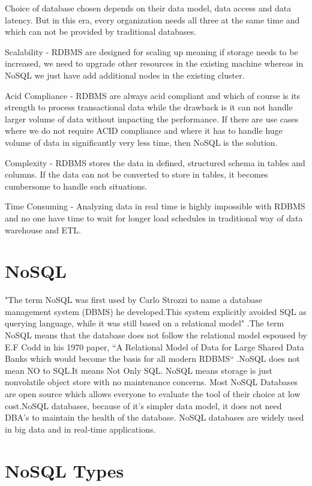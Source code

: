 \documentclass[sigconf]{acmart}
\begin{document}
Choice of database chosen depends on their data model, data access and data latency. But in this era, every organization needs all three at the same time and which can not be provided by traditional databases.

Scalability - RDBMS are designed for scaling up meaning if storage needs to be increased, we need to upgrade other resources in the existing machine whereas in NoSQL we just have add additional nodes in the existing cluster. 

Acid Compliance - RDBMS are always acid compliant and which of course is its strength to process transactional data while the drawback is it can not handle larger volume of data without impacting the performance. If there are use cases where we do not require ACID compliance and  where it has to handle huge volume of data in significantly very less time, then NoSQL is the solution.

Complexity - RDBMS stores the data in defined, structured schema in tables and columns. If the data can not be converted to store in tables, it becomes cumbersome to handle such situations. 

Time Consuming - Analyzing data in real time is highly impossible with RDBMS and no one have time to wait for longer load schedules in traditional way of data warehouse and ETL.

\section{NoSQL}

"The term NoSQL was first used by Carlo Strozzi to name a database management system (DBMS) he developed.This system explicitly avoided SQL as querying language, while it was still based on a relational model" \cite{seasupenn}.The term NoSQL means that the database does not follow the relational model espoused by E.F Codd in his 1970 paper, ``A Relational Model of Data for Large Shared Data Banks which would become the basis for all modern RDBMS`` \cite{rdbms}.NoSQL does not mean NO to SQL.It means Not Only SQL. NoSQL means storage is just nonvolatile object store with no maintenance concerns. Most NoSQL Databases are open source which allows everyone to evaluate the tool of their choice at low cost.NoSQL databases, because of it's simpler data model, it does not need DBA's to maintain the health of the database. NoSQL databases are widely used in big data and in real-time  applications.  

\section{NoSQL Types}
\end{document}
